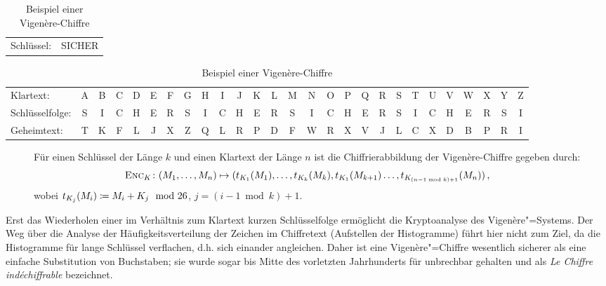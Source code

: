 \begin{table}[h]
  \centering
  \setlength{\tabcolsep}{2pt}
  \begin{tabular}{ll}
    Schlüssel: 
    & SICHER
  \end{tabular}
  \begin{tabular}{l*{26}{c}}
    Klartext:
    &A&B&C&D&E&F&G&H&I&J&K&L&M&N&O&P&Q&R&S&T&U&V&W&X&Y&Z\\
    Schlüsselfolge:
    &S&I&C&H&E&R&S&I&C&H&E&R&S&I&C&H&E&R&S&I&C&H&E&R&S&I\\
    Geheimtext:
    &T&K&F&L&J&X&Z&Q&L&R&P&D&F&W&R&X&V&J&L&C&X&D&B&P&R&I\\
  \end{tabular}
  \caption{Beispiel einer Vigenère-Chiffre}
\end{table}

\begin{figure}[h]
  Für einen Schlüssel der Länge $k$ und einen Klartext der Länge $n$ ist die Chiffrierabbildung der Vigenère-Chiffre gegeben durch:
  \begin{align*}
    \textsc{Enc}_{K}\colon (M_1,\ldots,M_{n}) \mapsto
    (t_{K_1}(M_1),\ldots,t_{K_{k}}(M_{k}),t_{K_1}(M_{k+1})\ldots,t_{K_{(n-1
    \bmod k)+1}}(M_{n}))\, ,
  \end{align*}
  wobei $t_{K_{j}}(M_{i}) \coloneqq M_{i} + K_{j} \mod
  26$, $j = (i-1 \bmod k)+1$. 
\end{figure}
Erst das Wiederholen einer im Verhältnis zum Klartext kurzen
Schlüsselfolge ermöglicht die Kryptoanalyse des Vigenère"=Systems.  Der
Weg über die Analyse der Häufigkeitsverteilung der Zeichen im
Chiffretext (Aufstellen der Histogramme) führt hier nicht zum Ziel, da
die Histogramme für lange Schlüssel verflachen, d.h. sich einander
angleichen. Daher ist eine Vigenère"=Chiffre wesentlich sicherer als
eine einfache Substitution von Buchstaben; sie wurde sogar bis Mitte des
vorletzten Jahrhunderts für unbrechbar gehalten und als \emph{Le Chiffre
indéchiffrable} bezeichnet.


